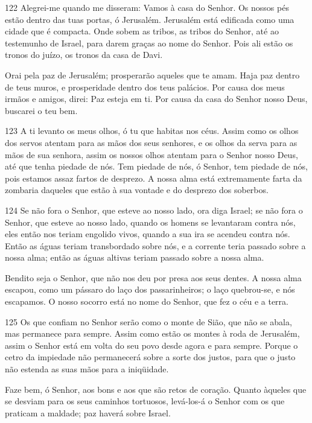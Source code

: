 \bigskip

\lettrine{122}{} Alegrei-me quando me disseram: Vamos à casa do
Senhor. Os nossos pés estão dentro das tuas portas, ó Jerusalém.
Jerusalém está edificada como uma cidade que é compacta.
Onde sobem as tribos, as tribos do Senhor, até ao testemunho de
Israel, para darem graças ao nome do Senhor. Pois ali estão os
tronos do juízo, os tronos da casa de Davi.

Orai pela paz de Jerusalém; prosperarão aqueles que te amam.
Haja paz dentro de teus muros, e prosperidade dentro dos teus
palácios. Por causa dos meus irmãos e amigos, direi: Paz esteja
em ti. Por causa da casa do Senhor nosso Deus, buscarei o teu
bem.

\bigskip

\lettrine{123}{} A ti levanto os meus olhos, ó tu que habitas
nos céus. Assim como os olhos dos servos atentam para as mãos
dos seus senhores, e os olhos da serva para as mãos de sua senhora,
assim os nossos olhos atentam para o Senhor nosso Deus, até que
tenha piedade de nós. Tem piedade de nós, ó Senhor, tem piedade
de nós, pois estamos assaz fartos de desprezo. A nossa alma está
extremamente farta da zombaria daqueles que estão à sua vontade e do
desprezo dos soberbos.

\bigskip

\lettrine{124}{} Se não fora o Senhor, que esteve ao nosso lado,
ora diga Israel; se não fora o Senhor, que esteve ao nosso lado,
quando os homens se levantaram contra nós, eles então nos teriam
engolido vivos, quando a sua ira se acendeu contra nós. Então as
águas teriam transbordado sobre nós, e a corrente teria passado
sobre a nossa alma; então as águas altivas teriam passado sobre
a nossa alma.

Bendito seja o Senhor, que não nos deu por presa aos seus dentes.
A nossa alma escapou, como um pássaro do laço dos
passarinheiros; o laço quebrou-se, e nós escapamos. O nosso
socorro está no nome do Senhor, que fez o céu e a terra.

\bigskip

\lettrine{125}{} Os que confiam no Senhor serão como o monte de
Sião, que não se abala, mas permanece para sempre. Assim como
estão os montes à roda de Jerusalém, assim o Senhor está em volta do
seu povo desde agora e para sempre. Porque o cetro da impiedade
não permanecerá sobre a sorte dos justos, para que o justo não
estenda as suas mãos para a iniqüidade.

Faze bem, ó Senhor, aos bons e aos que são retos de coração.
Quanto àqueles que se desviam para os seus caminhos tortuosos,
levá-los-á o Senhor com os que praticam a maldade; paz haverá sobre
Israel.

